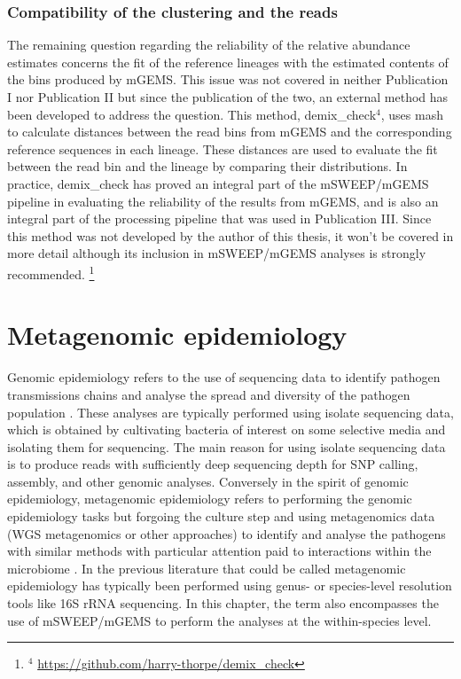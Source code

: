 \documentclass[officiallayout]{tktla}
\begin{document}
\subsection{Compatibility of the clustering and the reads}

The remaining question regarding the reliability of the relative
abundance estimates concerns the fit of the reference lineages with
the estimated contents of the bins produced by mGEMS. This issue was
not covered in neither Publication I nor Publication II but since the
publication of the two, an external method has been developed to
address the question. This method, demix\_check$^{4}$, uses mash
\citep{ondov2016mash} to calculate distances between the read bins
from mGEMS and the corresponding reference sequences in each
lineage. These distances are used to evaluate the fit between the read
bin and the lineage by comparing their distributions. In practice,
demix\_check has proved an integral part of the mSWEEP/mGEMS pipeline
in evaluating the reliability of the results from mGEMS, and is also
an integral part of the processing pipeline that was used in
Publication III. Since this method was not developed by the author of
this thesis, it won't be covered in more detail although its inclusion
in mSWEEP/mGEMS analyses is strongly recommended.
\noindent\let\thefootnote\relax\footnote{$^{4}$ \url{https://github.com/harry-thorpe/demix_check}}

\chapter{Metagenomic epidemiology}
\label{section:metagenomic-epidemiology}

Genomic epidemiology refers to the use of sequencing data to identify
pathogen transmissions chains and analyse the spread and diversity of
the pathogen population \citep{tang2017infection,
  grad2014epidemiologic, kwong2015whole}. These analyses are typically
performed using isolate sequencing data, which is obtained by
cultivating bacteria of interest on some selective media and isolating
them for sequencing. The main reason for using isolate sequencing data
is to produce reads with sufficiently deep sequencing depth for SNP
calling, assembly, and other genomic analyses. Conversely in the
spirit of genomic epidemiology, metagenomic epidemiology refers to
performing the genomic epidemiology tasks but forgoing the culture
step and using metagenomics data (WGS metagenomics or other
approaches) to identify and analyse the pathogens with similar methods
with particular attention paid to interactions within the microbiome
\citep{francis2015metagenomic, baquero2012metagenomic}. In the
previous literature that could be called metagenomic epidemiology has
typically been performed using genus- or species-level resolution
tools like 16S rRNA sequencing. In this chapter, the term also
encompasses the use of mSWEEP/mGEMS to perform the analyses at the
within-species level.
\end{document}
